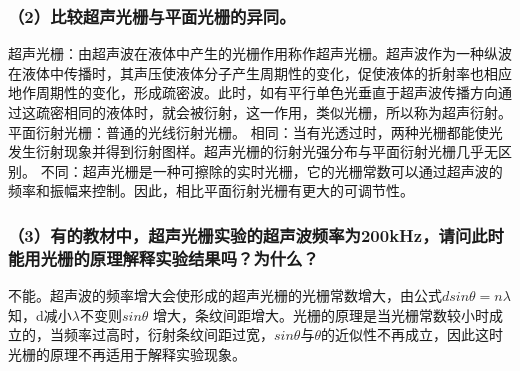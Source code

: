 \documentclass[12pt,a4paper,UTF8]{ctexart}
\begin{document}
\subsubsection*{（2）比较超声光栅与平面光栅的异同。}
超声光栅：由超声波在液体中产生的光栅作用称作超声光栅。超声波作为一种纵波在液体中传播时，其声压使液体分子产生周期性的变化，促使液体的折射率也相应地作周期性的变化，形成疏密波。此时，如有平行单色光垂直于超声波传播方向通过这疏密相同的液体时，就会被衍射，这一作用，类似光栅，所以称为超声衍射。
平面衍射光栅：普通的光线衍射光栅。
相同：当有光透过时，两种光栅都能使光发生衍射现象并得到衍射图样。超声光栅的衍射光强分布与平面衍射光栅几乎无区别。
不同：超声光栅是一种可擦除的实时光栅，它的光栅常数可以通过超声波的频率和振幅来控制。因此，相比平面衍射光栅有更大的可调节性。

\subsubsection*{（3）有的教材中，超声光栅实验的超声波频率为200kHz，请问此时能用光栅的原理解释实验结果吗？为什么？}
不能。超声波的频率增大会使形成的超声光栅的光栅常数增大，由公式$dsin\theta=n\lambda$知，d减小$\lambda$不变则$sin\theta$ 增大，条纹间距增大。光栅的原理是当光栅常数较小时成立的，当频率过高时，衍射条纹间距过宽，$sin\theta$与$\theta$的近似性不再成立，因此这时光栅的原理不再适用于解释实验现象。
\end{document}
